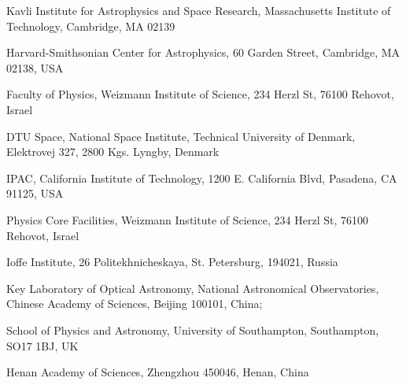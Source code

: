 \documentclass{nature_plusfigure}
\begin{document}
\begin{small}
\begin{affiliations}
\item Kavli Institute for Astrophysics and Space Research, Massachusetts Institute of Technology, Cambridge, MA 02139
\item Harvard-Smithsonian Center for Astrophysics, 60 Garden Street, Cambridge, MA 02138, USA
\item Faculty of Physics, Weizmann Institute of Science, 234 Herzl St, 76100 Rehovot, Israel
\item DTU Space, National Space Institute, Technical University of Denmark, Elektrovej 327, 2800 Kgs. Lyngby, Denmark
\item IPAC, California Institute of Technology, 1200 E. California Blvd, Pasadena, CA 91125, USA
\item Physics Core Facilities, Weizmann Institute of Science, 234 Herzl St, 76100 Rehovot, Israel
\item Ioffe Institute, 26 Politekhnicheskaya, St. Petersburg, 194021, Russia
\item Key Laboratory of Optical Astronomy, National Astronomical Observatories, Chinese Academy of Sciences, Beĳing 100101, China; 
\item School of Physics and Astronomy, University of Southampton, Southampton, SO17 1BJ, UK
\item Henan Academy of Sciences, Zhengzhou 450046, Henan, China

\end{affiliations}
\end{small}
\end{document}
